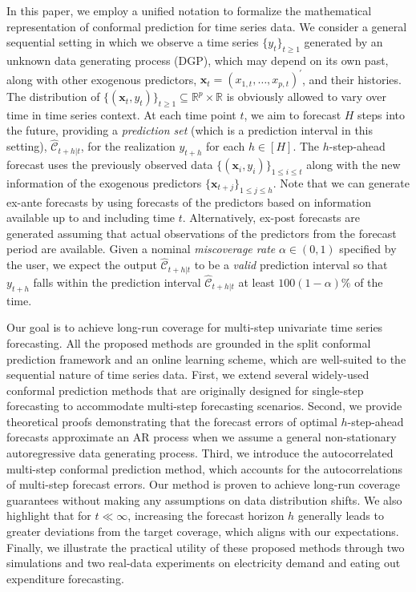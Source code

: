 \documentclass[
  11pt,
  a4paper,
]{article}
\theoremstyle{plain}
\theoremstyle{remark}
\begin{document}
In this paper, we employ a unified notation to formalize the
mathematical representation of conformal prediction for time series
data. We consider a general sequential setting in which we observe a
time series \(\{y_t\}_{t \geq 1}\) generated by an unknown data
generating process (DGP), which may depend on its own past, along with
other exogenous predictors,
\(\bm{x}_t=(x_{1,t},\ldots,x_{p,t})^{\prime}\), and their histories. The
distribution of
\(\{(\bm{x}_t, y_t)\}_{t \geq 1} \subseteq \mathbb{R}^p \times \mathbb{R}\)
is obviously allowed to vary over time in time series context. At each
time point \(t\), we aim to forecast \(H\) steps into the future,
providing a \emph{prediction set} (which is a prediction interval in
this setting), \(\hat{\mathcal{C}}_{t+h|t}\), for the realization
\(y_{t+h}\) for each \(h\in[H]\). The \(h\)-step-ahead forecast uses the
previously observed data \(\{(\bm{x}_i, y_i)\}_{1 \leq i \leq t}\) along
with the new information of the exogenous predictors
\(\{\bm{x}_{t+j}\}_{1\leq j\leq h}\). Note that we can generate ex-ante
forecasts by using forecasts of the predictors based on information
available up to and including time \(t\). Alternatively, ex-post
forecasts are generated assuming that actual observations of the
predictors from the forecast period are available. Given a nominal
\emph{miscoverage rate} \(\alpha \in (0,1)\) specified by the user, we
expect the output \(\hat{\mathcal{C}}_{t+h|t}\) to be a \emph{valid}
prediction interval so that \(y_{t+h}\) falls within the prediction
interval \(\hat{\mathcal{C}}_{t+h|t}\) at least \(100(1-\alpha)\%\) of
the time.

Our goal is to achieve long-run coverage for multi-step univariate time
series forecasting. All the proposed methods are grounded in the split
conformal prediction framework and an online learning scheme, which are
well-suited to the sequential nature of time series data. First, we
extend several widely-used conformal prediction methods that are
originally designed for single-step forecasting to accommodate
multi-step forecasting scenarios. Second, we provide theoretical proofs
demonstrating that the forecast errors of optimal \(h\)-step-ahead
forecasts approximate an AR process when we assume a general
non-stationary autoregressive data generating process. Third, we
introduce the autocorrelated multi-step conformal prediction method,
which accounts for the autocorrelations of multi-step forecast errors.
Our method is proven to achieve long-run coverage guarantees without
making any assumptions on data distribution shifts. We also highlight
that for \(t \ll \infty\), increasing the forecast horizon \(h\)
generally leads to greater deviations from the target coverage, which
aligns with our expectations. Finally, we illustrate the practical
utility of these proposed methods through two simulations and two
real-data experiments on electricity demand and eating out expenditure
forecasting.
\end{document}

